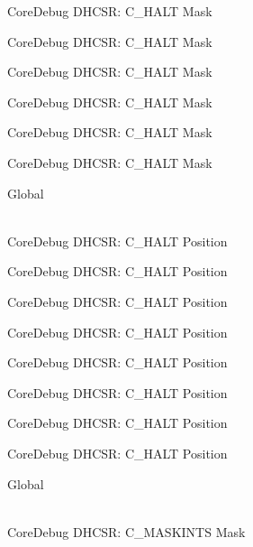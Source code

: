 \begin{DoxyRefList}
\label{deprecated__deprecated000182}%
%
Core\+Debug DHCSR\+: C\+\_\+\+HALT Mask 

\label{deprecated__deprecated000265}%
%
Core\+Debug DHCSR\+: C\+\_\+\+HALT Mask 

\label{deprecated__deprecated000324}%
%
Core\+Debug DHCSR\+: C\+\_\+\+HALT Mask 

\label{deprecated__deprecated000400}%
%
Core\+Debug DHCSR\+: C\+\_\+\+HALT Mask 

\label{deprecated__deprecated000489}%
%
Core\+Debug DHCSR\+: C\+\_\+\+HALT Mask 

\label{deprecated__deprecated000591}%
%
Core\+Debug DHCSR\+: C\+\_\+\+HALT Mask  
\item[{\parbox[t]{\linewidth}{Global \doxylink{group___c_m_s_i_s___core_debug_gaddf1d43f8857e4efc3dc4e6b15509692}{Core\+Debug\+\_\+\+DHCSR\+\_\+\+C\+\_\+\+HALT\+\_\+\+Pos} }}]\hfill \\
\label{deprecated__deprecated000037}%
%
Core\+Debug DHCSR\+: C\+\_\+\+HALT Position 

\label{deprecated__deprecated000125}%
%
Core\+Debug DHCSR\+: C\+\_\+\+HALT Position 

\label{deprecated__deprecated000181}%
%
Core\+Debug DHCSR\+: C\+\_\+\+HALT Position 

\label{deprecated__deprecated000264}%
%
Core\+Debug DHCSR\+: C\+\_\+\+HALT Position 

\label{deprecated__deprecated000323}%
%
Core\+Debug DHCSR\+: C\+\_\+\+HALT Position 

\label{deprecated__deprecated000399}%
%
Core\+Debug DHCSR\+: C\+\_\+\+HALT Position 

\label{deprecated__deprecated000488}%
%
Core\+Debug DHCSR\+: C\+\_\+\+HALT Position 

\label{deprecated__deprecated000590}%
%
Core\+Debug DHCSR\+: C\+\_\+\+HALT Position  
\item[{\parbox[t]{\linewidth}{Global \doxylink{group___c_m_s_i_s___core_debug_ga77fe1ef3c4a729c1c82fb62a94a51c31}{Core\+Debug\+\_\+\+DHCSR\+\_\+\+C\+\_\+\+MASKINTS\+\_\+\+Msk} }}]\hfill \\
\label{deprecated__deprecated000034}%
%
Core\+Debug DHCSR\+: C\+\_\+\+MASKINTS Mask 


\end{DoxyRefList}
